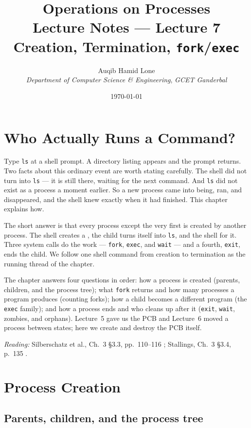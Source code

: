 \documentclass[11pt]{article}
\title{Operations on Processes\\\large Lecture Notes --- Lecture 7\\
  \normalsize Creation, Termination, \texttt{fork}/\texttt{exec}}
\author{Auqib Hamid Lone\\[0.3em]
  \emph{Department of Computer Science \& Engineering}, \emph{GCET Ganderbal}}
\date{\today}
\begin{document}
\maketitle

\section{Who Actually Runs a Command?}

Type \texttt{ls} at a shell prompt. A directory listing appears and the prompt
returns. Two facts about this ordinary event are worth stating carefully. The
shell did not turn into \texttt{ls} --- it is still there, waiting for the next
command. And \texttt{ls} did not exist as a process a moment earlier. So a new
process came into being, ran, and disappeared, and the shell knew exactly when
it had finished. This chapter explains how.

The short answer is that every process except the very first is created by
another process. The shell creates a , the child turns itself into
\texttt{ls}, and the shell  for it. Three system calls do the work
--- \texttt{fork}, \texttt{exec}, and \texttt{wait} --- and a fourth,
\texttt{exit}, ends the child. We follow one shell command from creation to
termination as the running thread of the chapter.

The chapter answers four questions in order: how a process is created (parents,
children, and the process tree); what \texttt{fork} returns and how many
processes a program produces (counting forks); how a child becomes a different
program (the \texttt{exec} family); and how a process ends and who cleans up
after it (\texttt{exit}, \texttt{wait}, zombies, and orphans). Lecture~5 gave us
the PCB and Lecture~6 moved a process between states; here we create and
destroy the PCB itself.

\medskip\noindent\textit{Reading:} Silberschatz et al., Ch.~3 \S3.3,
pp.~110--116 \cite{SilberschatzOSC_operating_system_concepts}; Stallings, Ch.~3
\S3.4, p.~135 \cite{StallingsOS_internals_design_principles}.

\section{Process Creation}

\subsection{Parents, children, and the process tree}
\end{document}

